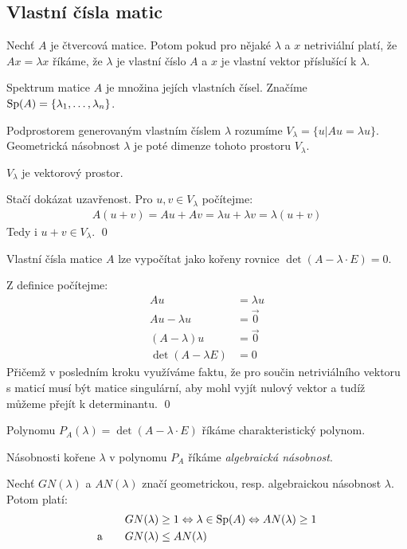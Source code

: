 \subsection{Vlastní čísla matic}


\df Nechť $A$ je čtvercová matice. Potom pokud pro nějaké $\lambda$ a $x$ netriviální platí, že $Ax=\lambda x$ říkáme, že $\lambda$ je vlastní číslo $A$ a $x$ je vlastní vektor příslušící k $\lambda$.

\df Spektrum matice $A$ je množina jejích vlastních čísel. Značíme $\operatorname{Sp}(A) = \{ \lambda_1, \ldots, \lambda_n \}$.

\df Podprostorem generovaným vlastním číslem $\lambda$ rozumíme $V_\lambda = \{u | Au = \lambda u \}$. Geometrická násobnost $\lambda$ je poté dimenze tohoto prostoru $V_\lambda$.

\tv $V_\lambda$ je vektorový prostor.

\dk Stačí dokázat uzavřenost. Pro $u,v\in V_\lambda$ počítejme:
\begin{align}
	A(u+v) = Au + Av = \lambda u + \lambda v = \lambda(u+v)
\end{align}
Tedy i $u+v\in V_\lambda$. \qed

\tv Vlastní čísla matice $A$ lze vypočítat jako kořeny rovnice $\det(A - \lambda \cdot E) = 0$.

\dk Z definice počítejme:
\begin{align}
	Au &= \lambda u \\
	Au - \lambda u &= \vec0 \\
	(A-\lambda) u &= \vec0 \\
	\det(A - \lambda E) &= 0 
\end{align}
Přičemž v posledním kroku využíváme faktu, že pro součin netriviálního vektoru s maticí musí být matice singulární, aby mohl vyjít nulový vektor a tudíž můžeme přejít k determinantu. \qed

\df Polynomu $P_A(\lambda) = \det(A - \lambda \cdot E)$ říkáme charakteristický polynom.

\df Násobnosti kořene $\lambda$ v polynomu $P_A$ říkáme {\it algebraická násobnost}.

\vt Nechť $GN(\lambda)$ a $AN(\lambda)$ značí geometrickou, resp. algebraickou násobnost $\lambda$. Potom platí:
\begin{align}
&GN(\lambda) \geq 1 \Leftrightarrow \lambda \in \operatorname{Sp}(A) \Leftrightarrow AN(\lambda) \geq 1\\
\text{a}\qquad &GN(\lambda) \leq AN(\lambda)
\end{align}

